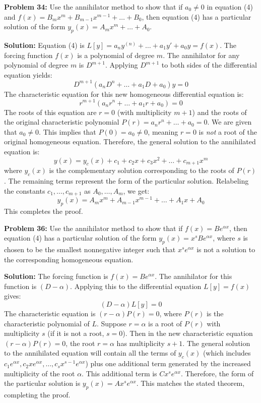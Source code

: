 \documentclass[11pt]{article}
\begin{document}
\textbf{Problem 34:} Use the annihilator method to show that if $a_0 \neq 0$ in equation (4) and $f(x) = B_m x^m + B_{m-1} x^{m-1} + \dots + B_0$, then equation (4) has a particular solution of the form $y_p(x) = A_m x^m + \dots + A_0$.

\textbf{Solution:}
Equation (4) is $L[y] = a_n y^{(n)} + \dots + a_1 y' + a_0 y = f(x)$.
The forcing function $f(x)$ is a polynomial of degree $m$. The annihilator for any polynomial of degree $m$ is $D^{m+1}$.
Applying $D^{m+1}$ to both sides of the differential equation yields:
\[ D^{m+1} (a_n D^n + \dots + a_1 D + a_0) y = 0 \]
The characteristic equation for this new homogeneous differential equation is:
\[ r^{m+1} (a_n r^n + \dots + a_1 r + a_0) = 0 \]
The roots of this equation are $r = 0$ (with multiplicity $m+1$) and the roots of the original characteristic polynomial $P(r) = a_n r^n + \dots + a_0 = 0$.
We are given that $a_0 \neq 0$. This implies that $P(0) = a_0 \neq 0$, meaning $r = 0$ is \textit{not} a root of the original homogeneous equation.
Therefore, the general solution to the annihilated equation is:
\[ y(x) = y_c(x) + c_1 + c_2 x + c_3 x^2 + \dots + c_{m+1} x^m \]
where $y_c(x)$ is the complementary solution corresponding to the roots of $P(r)$.
The remaining terms represent the form of the particular solution. Relabeling the constants $c_1, \dots, c_{m+1}$ as $A_0, \dots, A_m$, we get:
\[ y_p(x) = A_m x^m + A_{m-1} x^{m-1} + \dots + A_1 x + A_0 \]
This completes the proof.

\vspace{0.5cm}
\textbf{Problem 36:} Use the annihilator method to show that if $f(x) = B e^{\alpha x}$, then equation (4) has a particular solution of the form $y_p(x) = x^s B e^{\alpha x}$, where $s$ is chosen to be the smallest nonnegative integer such that $x^s e^{\alpha x}$ is not a solution to the corresponding homogeneous equation.

\textbf{Solution:}
The forcing function is $f(x) = B e^{\alpha x}$. The annihilator for this function is $(D - \alpha)$.
Applying this to the differential equation $L[y] = f(x)$ gives:
\[ (D - \alpha) L[y] = 0 \]
The characteristic equation is $(r - \alpha) P(r) = 0$, where $P(r)$ is the characteristic polynomial of $L$.
Suppose $r = \alpha$ is a root of $P(r)$ with multiplicity $s$ (if it is not a root, $s = 0$).
Then in the new characteristic equation $(r - \alpha) P(r) = 0$, the root $r = \alpha$ has multiplicity $s + 1$.
The general solution to the annihilated equation will contain all the terms of $y_c(x)$ (which includes $c_1 e^{\alpha x}, c_2 x e^{\alpha x}, \dots, c_s x^{s-1} e^{\alpha x}$) plus one additional term generated by the increased multiplicity of the root $\alpha$.
This additional term is $C x^s e^{\alpha x}$.
Therefore, the form of the particular solution is $y_p(x) = A x^s e^{\alpha x}$. This matches the stated theorem, completing the proof.
\end{document}
